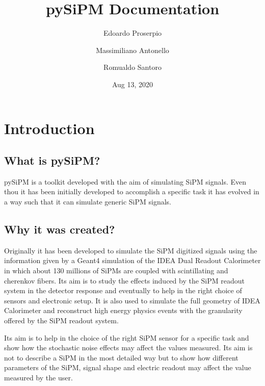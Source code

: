 \documentclass[letterpaper,10pt,english]{sphinxmanual}
\title{pySiPM Documentation}
\date{Aug 13, 2020}
\author{Edoardo Proserpio\and Massimiliano Antonello\and Romualdo Santoro}
\begin{document}
\pagestyle{empty}
\sphinxmaketitle
\pagestyle{plain}
\sphinxtableofcontents
\pagestyle{normal}
\label{\detokenize{index::doc}}



\chapter{Introduction}
\label{\detokenize{introduction:introduction}}\label{\detokenize{introduction::doc}}

\section{What is pySiPM?}
\label{\detokenize{introduction:what-is-pysipm}}
pySiPM is a toolkit developed with the aim of simulating SiPM signals.
Even thou it has been initially developed to accomplish a specific task it has evolved in a way such that it can simulate generic SiPM signals.


\section{Why it was created?}
\label{\detokenize{introduction:why-it-was-created}}
Originally it has been developed to simulate the SiPM digitized signals using the information given by a Geant4 simulation of the IDEA Dual Readout Calorimeter in which about 130 millions of SiPMs are coupled with scintillating and cherenkov fibers.
Its aim is to study the effects induced by the SiPM readout system in the detector response and eventually to help in the right choice of sensors and electronic setup.
It is also used to simulate the full geometry of IDEA Calorimeter and reconstruct high energy physics events with the granularity offered by the SiPM readout system.

Its aim is to help in the choice of the right SiPM sensor for a specific task and show how the stochastic noise effects may affect the values measured. Its aim is not to describe a SiPM in the most detailed way but to show how different parameters of the SiPM, signal shape and electric readout may affect the value measured by the user.
\end{document}
